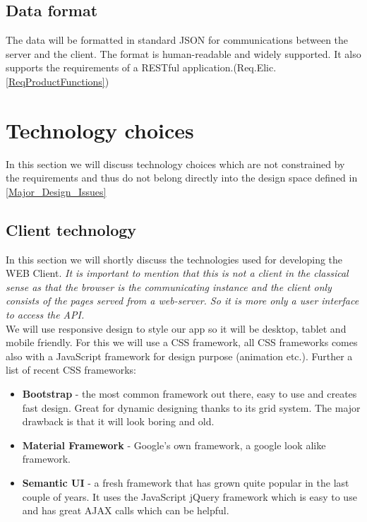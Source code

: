\documentclass[a4paper,11pt]{article}
\begin{document}
\subsection{Data format}
The data will be formatted in standard JSON for communications between the server and the client. The format is human-readable and widely supported. It also supports the requirements of a RESTful application.(Req.Elic. \ref{ReqProductFunctions})

\section{Technology choices} \label{Technology_choices}
In this section we will discuss technology choices which are not constrained by the requirements and thus do not belong directly into the design space defined in \ref{Major_Design_Issues}

\subsection{Client technology}
 In this section we will shortly discuss the technologies used for developing the WEB Client. \textit{It is important to mention that this is not a client in the classical sense as that the browser is the communicating instance and the client only consists of the pages served from a web-server. So it is more only a user interface to access the API.} \\
 We will use responsive design to style our app so it will be desktop, tablet and mobile friendly. For this we will use a CSS framework, all CSS frameworks comes also with a JavaScript framework for design purpose (animation etc.). Further a list of recent CSS frameworks:

\begin{itemize}
\item
  \textbf{Bootstrap} - the most common framework out there, easy to use
  and creates fast design. Great for dynamic designing thanks to its
  grid system. The major drawback is that it will look boring and old.
\item
  \textbf{Material Framework} - Google's own framework, a google look
  alike framework.
\item
  \textbf{Semantic UI} - a fresh framework that has grown quite popular
  in the last couple of years. It uses the JavaScript jQuery framework
  which is easy to use and has great AJAX calls which can be helpful.
\end{itemize}
\end{document}
